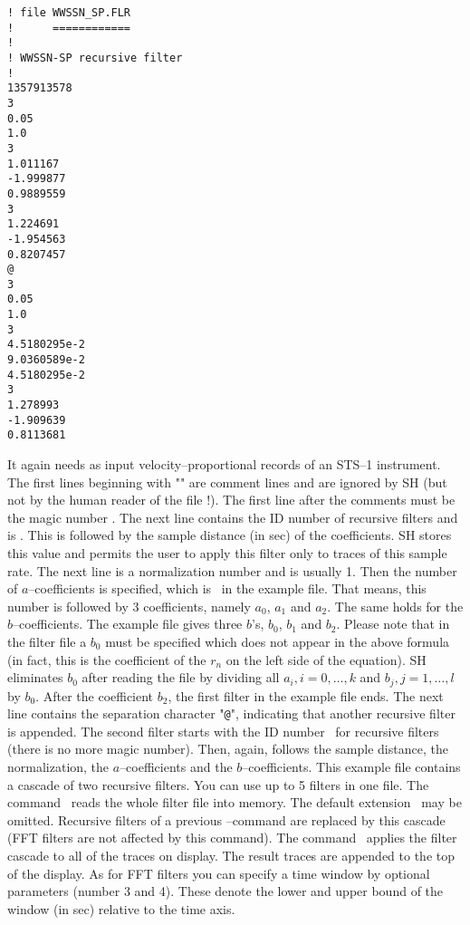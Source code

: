 \begin{verbatim}
! file WWSSN_SP.FLR
!      ============
!
! WWSSN-SP recursive filter
!
1357913578
3
0.05
1.0
3
1.011167
-1.999877
0.9889559
3
1.224691
-1.954563
0.8207457
@
3
0.05
1.0
3
4.5180295e-2
9.0360589e-2
4.5180295e-2
3
1.278993
-1.909639
0.8113681
\end{verbatim}

It again needs as input velocity--proportional records of an STS--1
instrument.  The first lines beginning with "\exm{!}" are comment
lines and are ignored by SH (but not by the human reader of the
file !).  The first line after the comments must be the magic number
.  The next line contains the ID number of
recursive filters and is .  This is followed by the
sample distance (in sec) of the coefficients.  SH stores this value
and permits the user to apply this filter only to traces of this
sample rate.  The next line is a normalization number and is
usually 1.  Then the number of $a$--coefficients is specified, which
is \ in the example file.  That means, this number is followed
by 3 coefficients, namely $a_0$, $a_1$ and $a_2$.  The same holds
for the $b$--coefficients.  The example file gives three $b$'s,
$b_0$, $b_1$ and $b_2$.  Please note that in the filter file
a $b_0$ must be specified which does not appear in the above
formula (in fact, this is the coefficient of the $r_n$ on the left
side of the equation).  SH eliminates $b_0$ after reading the
file by dividing all $a_i, i=0,\ldots,k$ and $b_j, j=1,\ldots,l$ by
$b_0$.  After the
coefficient $b_2$, the first filter in the example file ends.
The next line contains the separation character "\verb'@'",
indicating that another recursive filter is appended.  The second
filter starts with the ID number \ for recursive filters
(there is no more magic number).  Then, again, follows the
sample distance, the normalization, the $a$--coefficients and
the $b$--coefficients.  This example file contains a cascade
of two recursive filters.  You can use up to 5 filters in one
file.  The command \ reads the whole filter
file into memory.  The default extension \ may be
omitted.  Recursive filters of a previous
--command are replaced by this cascade  (FFT filters
are not affected by this command).  The command \
applies the filter cascade to all of the traces on display.
The result traces are appended to the top of the display.  As
for FFT filters you can specify a time window by optional
parameters (number 3 and 4).  These denote the lower and upper
bound of the window (in sec) relative to the time axis.


